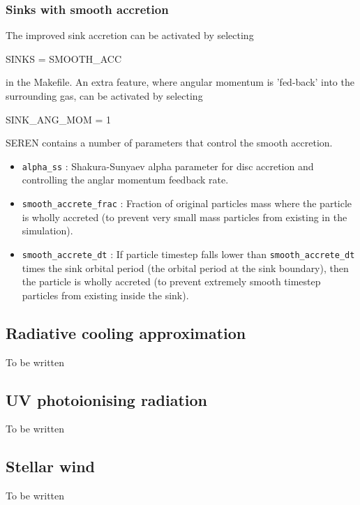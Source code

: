 \documentclass[a4paper]{article}
\newcommand{\var}[1]{\texttt{#1}}
\begin{document}
\subsubsection{Sinks with smooth accretion}
The improved sink accretion can be activated by selecting \newline

SINKS = SMOOTH\_ACC \newline

\noindent in the Makefile.  An extra feature, where angular momentum is 'fed-back' into the surrounding gas, can be activated by selecting \newline

SINK\_ANG\_MOM = 1 \newline

\noindent SEREN contains a number of parameters that control the smooth accretion.
\begin{itemize}
\item \var{alpha\_ss} : Shakura-Sunyaev alpha parameter for disc accretion and controlling the anglar momentum feedback rate.
\item \var{smooth\_accrete\_frac} : Fraction of original particles mass where the particle is wholly accreted (to prevent very small mass particles from existing in the simulation).
\item \var{smooth\_accrete\_dt} : If particle timestep falls lower than \var{smooth\_accrete\_dt} times the sink orbital period (the orbital period at the sink boundary), then the particle is wholly accreted (to prevent extremely smooth timestep particles from existing inside the sink).
\end{itemize}



\subsection{Radiative cooling approximation}
To be written


\subsection{UV photoionising radiation}
To be written


\subsection{Stellar wind}
To be written
\end{document}
